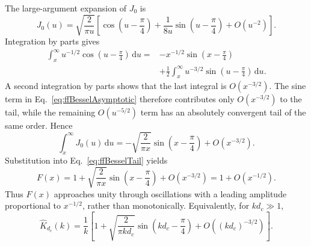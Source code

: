 \documentclass{article}
\begin{document}
The large-argument expansion of $J_0$ is
\begin{equation}
    J_0(u)=\sqrt{\frac{2}{\pi u}}
    \left[\cos\left(u-\frac{\pi}{4}\right)
    +\frac{1}{8u}\sin\left(u-\frac{\pi}{4}\right)
    +O(u^{-2})\right].
    \label{eq:ffBesselAsymptotic}
\end{equation}
Integration by parts gives
\begin{align}
    \int_x^\infty u^{-1/2}\cos\left(u-\frac{\pi}{4}\right)\,\mathrm du
    ={}&-x^{-1/2}\sin\left(x-\frac{\pi}{4}\right)\nonumber\\
    &+\frac12\int_x^\infty u^{-3/2}\sin\left(u-\frac{\pi}{4}\right)\,\mathrm du.
\end{align}
A second integration by parts shows that the last integral is $O(x^{-3/2})$. The sine term in Eq.~\eqref{eq:ffBesselAsymptotic} therefore contributes only $O(x^{-3/2})$ to the tail, while the remaining $O(u^{-5/2})$ term has an absolutely convergent tail of the same order. Hence
\begin{equation}
    \int_x^\infty J_0(u)\,\mathrm du
    =-\sqrt{\frac{2}{\pi x}}\sin\left(x-\frac{\pi}{4}\right)
    +O(x^{-3/2}).
\end{equation}
Substitution into Eq.~\eqref{eq:ffBesselTail} yields
\begin{equation}
    \boxed{F(x)=1+\sqrt{\frac{2}{\pi x}}\sin\left(x-\frac{\pi}{4}\right)
    +O(x^{-3/2})=1+O(x^{-1/2}).}
    \label{eq:ffIntegratedKernelAsymptotic}
\end{equation}
Thus $F(x)$ approaches unity through oscillations with a leading amplitude proportional to $x^{-1/2}$, rather than monotonically. Equivalently, for $kd_c\gg1$,
\begin{equation}
    \widehat K_{d_c}(k)=\frac1k\left[
    1+\sqrt{\frac{2}{\pi k d_c}}\sin\left(kd_c-\frac{\pi}{4}\right)
    +O((kd_c)^{-3/2})\right].
\end{equation}



\end{document}
